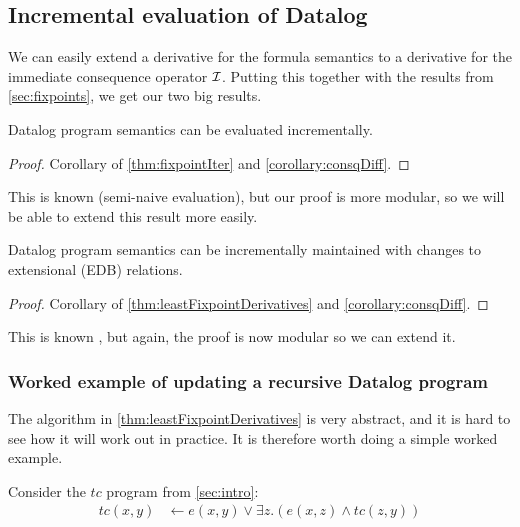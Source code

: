 \subsection{Incremental evaluation of Datalog}
\label{sec:datalogIncr}

We can easily extend a derivative for the formula semantics to a derivative for
the immediate consequence operator $\mathcal{I}$. Putting this together with the
results from \cref{sec:fixpoints}, we get our two big results.

\begin{corollary}
\label{thm:diffEval}
  Datalog program semantics can be evaluated incrementally.
\end{corollary}
\ifproofs
\begin{proof}
  Corollary of \cref{thm:fixpointIter} and \cref{corollary:consqDiff}.
\end{proof}
\fi

This is known (semi-naive evaluation), but our proof is more
modular, so we will be able to extend this result more easily.

\begin{corollary}
\label{thm:diffUpdate}
  Datalog program semantics can be incrementally maintained with changes to
  extensional (EDB) relations.
\end{corollary}
\ifproofs
\begin{proof}
  Corollary of \cref{thm:leastFixpointDerivatives} and \cref{corollary:consqDiff}.
\end{proof}
\fi

This is known \autocite[see][and successors]{gupta1993maintaining},
but again, the proof is now modular so we can extend it.

\subsubsection{Worked example of updating a recursive Datalog program}
\label{sec:workedExample}

The algorithm in \cref{thm:leastFixpointDerivatives} is very abstract, and it is
hard to see how it will work out in practice. It is therefore worth doing a
simple worked example.


Consider the $tc$ program from \cref{sec:intro}:
\begin{align*}
  tc(x, y) &\leftarrow e(x, y) \vee \exists z.(e(x, z) \wedge tc(z, y))
\end{align*}

